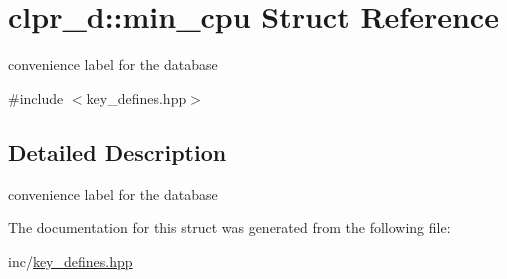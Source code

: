 \hypertarget{structclpr__d_1_1min__cpu}{\section{clpr\-\_\-d\-:\-:min\-\_\-cpu \-Struct \-Reference}
\label{structclpr__d_1_1min__cpu}
}


convenience label for the database  




{\ttfamily \#include $<$key\-\_\-defines.\-hpp$>$}



\subsection{\-Detailed \-Description}
convenience label for the database 

\-The documentation for this struct was generated from the following file\-:\begin{DoxyCompactItemize}
\item 
inc/\hyperlink{key__defines_8hpp}{key\-\_\-defines.\-hpp}\end{DoxyCompactItemize}
